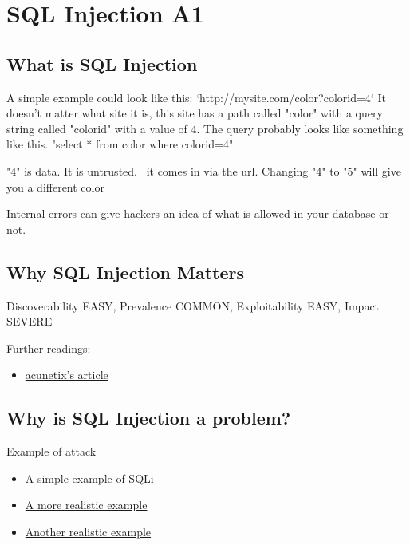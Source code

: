\documentclass[a4paper, titlepage]{article}
\begin{document}
\newpage

\section{SQL Injection A1}

\subsection{What is SQL Injection}
A simple example could look like this: `http://mysite.com/color?colorid=4`
It doesn't matter what site it is, this site has a path called "color" with a query string called "colorid" with a value of 4. The query probably looks like something like this. "select * from color where colorid=4"

"4" is data. It is untrusted. \ it comes in via the url. Changing "4" to "5" will give you a different color

Internal errors can give hackers an idea of what is allowed in your database or not.

\subsection{Why SQL Injection Matters}

Discoverability EASY, Prevalence COMMON, Exploitability EASY, Impact SEVERE

Further readings:

\begin{itemize}
    \item \href{https://www.acunetix.com/websitesecurity/sql-injection/}{acunetix's article}
\end{itemize}

\subsection{Why is SQL Injection a problem?}

Example of attack
\begin{itemize}
    \item \href{http://www.w3schools.com/sql/sql_injection.asp}{A simple example of SQLi}
    \item \href{https://www.hackthissite.org/missions/realistic/4/}{A more realistic example}
    \item \href{https://www.hackthissite.org/missions/realistic/2/}{Another realistic example}
\end{itemize}
\end{document}
